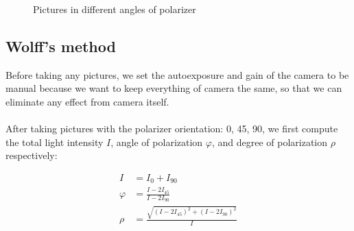 \documentclass[english]{article}
\begin{document}
\begin{figure}[H]
	\centering
	\caption{Pictures in different angles of polarizer}
	\label{fig:one}
\end{figure}

\subsection{Wolff's method}
Before taking any pictures, we set the autoexposure and gain of the camera to be manual because we want to keep everything of camera the same, so that we can eliminate any effect from camera itself.\\
\\
After taking pictures with the polarizer orientation: 0\textdegree, 45\textdegree, 90\textdegree, we first compute the total light intensity $I$, angle of polarization $\varphi$, and degree of polarization $\rho$ respectively:

\begin{align*} 
	I &= I_{0} + I_{90}\\
	\varphi &= \frac{I - 2I_{45}} {I - 2I_{90}}\\
	\rho &= \frac{\sqrt{(I-2I_{45})^{2} + (I-2I_{90})^{2}}}{I}
\end{align*}
\end{document}
